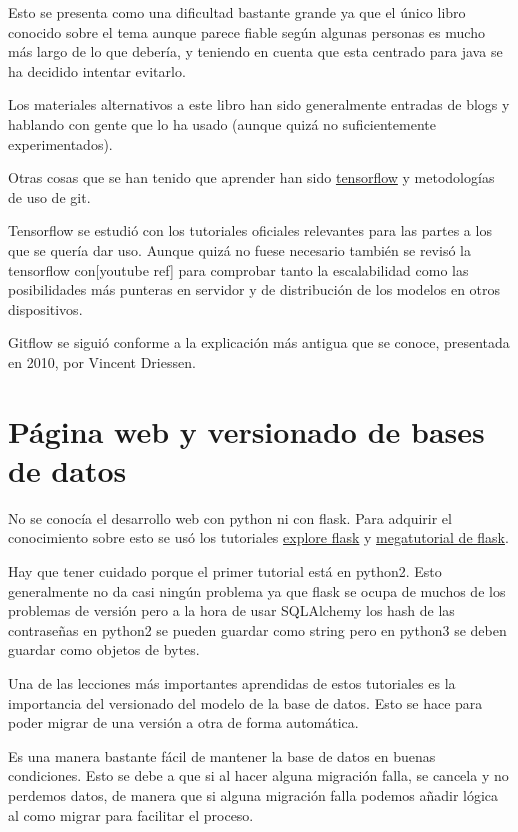 Esto se presenta como una dificultad bastante grande ya que el único libro conocido sobre el tema \cite{cont07} aunque parece fiable según algunas personas es mucho más largo de lo que debería, y teniendo en cuenta que esta centrado para java se ha decidido intentar evitarlo.

Los materiales alternativos a este libro han sido  generalmente entradas de blogs y hablando con gente que lo ha usado (aunque quizá no suficientemente experimentados). \cite{fow06}
\cite{dancont}

Otras cosas que se han tenido que aprender han sido \href{https://www.tensorflow.org/}{tensorflow} y metodologías de uso de git\cite{vin10}. 

Tensorflow se estudió con los tutoriales oficiales relevantes para las partes a los que se quería dar uso. Aunque quizá no fuese necesario también se revisó la tensorflow con[youtube ref] para comprobar tanto la escalabilidad como las posibilidades más punteras en servidor y de distribución de los modelos en otros dispositivos.

Gitflow se siguió conforme a la explicación más antigua que se conoce, presentada en 2010, por Vincent Driessen. \cite{vin10}

\section{Página web y versionado de bases de datos}

No se conocía el desarrollo web con python ni con flask. Para adquirir el conocimiento sobre esto se usó los tutoriales \href{https://exploreflask.com/en/latest/}{explore flask} y \href{https://blog.miguelgrinberg.com/post/the-flask-mega-tutorial-part-i-hello-world/page/0}{megatutorial de flask}.

Hay que tener cuidado porque el primer tutorial está en python2. Esto generalmente no da casi ningún problema ya que flask se ocupa de muchos de los problemas de versión pero a la hora de usar SQLAlchemy los hash de las contraseñas en python2 se pueden guardar como string pero en python3 se deben guardar como objetos de bytes.

Una de las lecciones más importantes aprendidas de estos tutoriales es la importancia del versionado del modelo de la base de datos. Esto se hace para poder migrar de una versión a otra de forma automática. 

Es una manera bastante fácil de mantener la base de datos en buenas condiciones. Esto se debe a que si al hacer alguna migración falla, se cancela y no perdemos datos, de manera que si alguna migración falla podemos añadir lógica al como migrar para facilitar el proceso.

